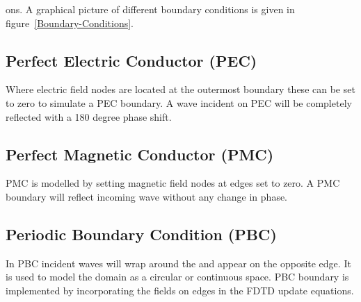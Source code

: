 ons. A graphical picture of different boundary conditions is given in figure~\ref{Boundary-Conditions}.
\subsection{Perfect Electric Conductor (PEC)}
Where electric field nodes are located at the outermost boundary these can be set to zero to simulate a PEC boundary. A wave incident on PEC will be completely reflected with a 180 degree phase shift.
\subsection{Perfect Magnetic Conductor (PMC)}
PMC is modelled by setting magnetic field nodes at edges set to zero. A PMC boundary will reflect incoming wave without any change in phase.
\subsection{Periodic Boundary Condition (PBC)}
In PBC incident waves will wrap around the and appear on the opposite edge. It is used to model the domain as a circular or continuous space. PBC boundary is implemented by incorporating the fields on edges in the FDTD update equations.
